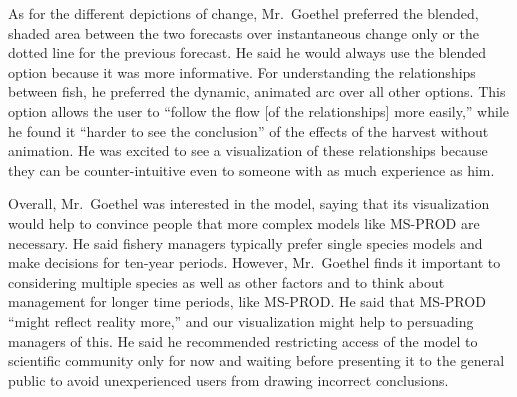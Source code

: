 As for the different depictions of change, Mr.\ Goethel preferred the blended, shaded area between the two forecasts over instantaneous change only or the dotted line for the previous forecast.  He said he would always use the blended option because it was more informative.  For understanding the relationships between fish, he preferred the dynamic, animated arc over all other options.  This option allows the user to ``follow the flow [of the relationships] more easily,'' while he found it ``harder to see the conclusion'' of the effects of the harvest without animation.  He was excited to see a visualization of these relationships because they can be counter-intuitive even to someone with as much experience as him.

Overall, Mr.\ Goethel was interested in the model, saying that its visualization would help to convince people that more complex models like MS-PROD are necessary.  He said fishery managers typically prefer single species models and make decisions for ten-year periods.  However, Mr.\ Goethel finds it important to considering multiple species as well as other factors and to think about management for longer time periods, like MS-PROD.  He said that MS-PROD ``might reflect reality more,'' and our visualization might help to persuading managers of this.  He said he recommended restricting access of the model to scientific community only for now and waiting before presenting it to the general public to avoid unexperienced users from drawing incorrect conclusions.
